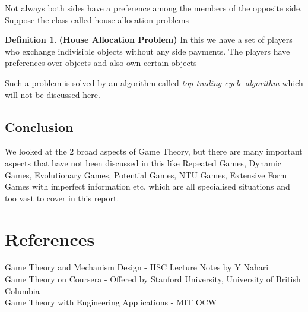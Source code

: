 \documentclass{article}
\theoremstyle{definition}
\newtheorem{defn}{Definition}[section]
\begin{document}
Not always both sides have a preference among the members of the opposite side. Suppose the class called house allocation problems
\begin{defn}
\textbf{(House Allocation Problem)} In this we have a set of players who exchange indivisible objects without any side payments. The players have preferences over objects and also own certain objects
\end{defn}
Such a problem is solved by an algorithm called \textit{top trading cycle algorithm} which will not be discussed here.

\subsection*{Conclusion}
We looked at the 2 broad aspects of Game Theory, but there are many important aspects that have not been discussed in this like Repeated Games, Dynamic Games, Evolutionary Games, Potential Games, NTU Games, Extensive Form Games with imperfect information etc. which are all specialised situations and too vast to cover in this report.

\section*{References}
Game Theory and Mechanism Design - IISC Lecture Notes by Y Nahari\\
Game Theory on Coursera - Offered by Stanford University, University of British Columbia\\
Game Theory with Engineering Applications - MIT OCW\\
\end{document}
